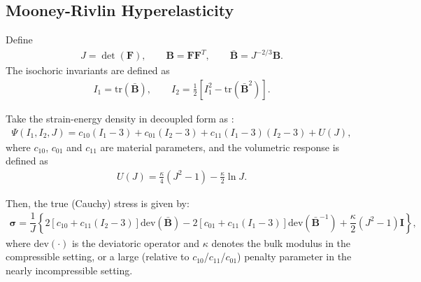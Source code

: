 \documentclass[review,3p]{elsarticle}
\newcommand{\bb}{\boldsymbol}
\begin{document}
\subsection{Mooney-Rivlin Hyperelasticity} 
\label{app:mechLaws:MR}
%
{\color{orange}
Define
%
\begin{eqnarray}
J=\det(\bb{F}), 
\qquad 
\bb{B}=\bb{F}\bb{F}^T,
\qquad
\bar{\bb{B}}=J^{-2/3}\bb{B}.
\end{eqnarray}
%
The isochoric invariants are defined as
%
\begin{eqnarray}
I_{1}=\mathrm{tr}(\bar{\bb{B}}),
\qquad
I_{2}=\frac{1}{2}\left[I_{1}^2 - \mathrm{tr}(\bar{\bb{B}}^2)\right].
\end{eqnarray}


Take the strain-energy density in decoupled form as \cite{Rivlin1951,oliveira2020}:
\begin{eqnarray}
	\Psi(I_1,I_2,J)
=
c_{10}(I_1-3)
+
c_{01}(I_2-3)
+
c_{11}(I_1-3)(I_2-3)
+
U(J),
\end{eqnarray}
%
where $c_{10}$, $c_{01}$ and $c_{11}$ are material parameters, and the volumetric response is defined as
\begin{eqnarray}
	U(J)=\frac{\kappa}{4}(J^2-1)-\frac{\kappa}{2}\ln J.
\end{eqnarray}


Then, the true (Cauchy) stress is given by:
%
\begin{eqnarray}
	\boldsymbol{\sigma}
	=
	\dfrac{1}{J}
	\left\{
		2\left[c_{10}+c_{11}\left( I_{2} - 3\right) \right] \mathrm{dev}\left( \bar{\bb{B}} \right)
	      - 2\left[c_{01}+c_{11}\left( I_{1}-3\right) \right] \mathrm{dev}\left( \bar{\bb{B}}^{-1} \right) 
              + \dfrac{\kappa}{2}
		 \left( J^2-1\right) \textbf{I}
	\right\},
\end{eqnarray}
%
where $\text{dev}\left(\bb{\cdot}\right)$ is the deviatoric operator
%
and $\kappa$ denotes the bulk modulus in the compressible setting, or a large (relative to $c_{10}$/$c_{11}$/$c_{01}$) penalty parameter in the nearly incompressible setting.
}

%
%
\end{document}
